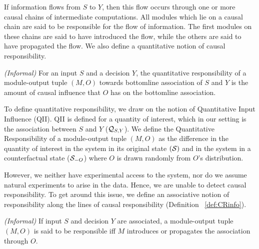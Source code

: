 \documentclass[10pt, onecolumn]{report}
\begin{document}
If information flows from $S$ to $Y$, then this flow occurs 
through one or more causal chains of intermediate computations. 
All modules which lie on a causal chain are said 
to be responsible for the flow of information. The first modules on these chains
are said to have introduced the flow, while the others are said to have propagated
the flow. We also define a quantitative notion of causal responsibility. 

\begin{definition}\label{def:QCR}\emph{(Informal)}
For an input $S$ and a decision $Y$, the quantitative responsibility 
of a module-output tuple $(M, O)$ towards bottomline association of $S$ and $Y$ 
is the amount of causal influence that $O$ has on the bottomline association.
\end{definition}
To define quantitative responsibility, we draw on the notion
of Quantitative Input Influence (QII)\cite{datta2016algorithmic}. QII is defined for a
quantity of interest, which in our setting is the association between $S$ and $Y$ 
($\mathcal{Q}_{S, Y}$). 
We define the Quantitative Responsibility of a module-output tuple $(M, O)$ 
as the difference in the quantity of interest in the system in its original state $(\mathcal{S})$
and in the system in a counterfactual state ($\mathcal{S}_{-O}$)
where $O$ is drawn randomly from $O$'s distribution. 

However, we neither have experimental access to the system, nor do we assume
natural experiments to arise in the data. Hence, we are unable to detect 
causal responsibility. 
To get around this issue, we define an associative notion of responsibility along
the lines of causal responsibility (Definition ~\ref{def:CRinfo}).

\begin{definition}\label{def:AR}\emph{(Informal)}
If input $S$ and decision $Y$ are associated, a module-output tuple $(M, O)$ 
is said to be responsible
iff $M$ introduces or propagates the association through $O$. 
\end{definition}
\end{document}

